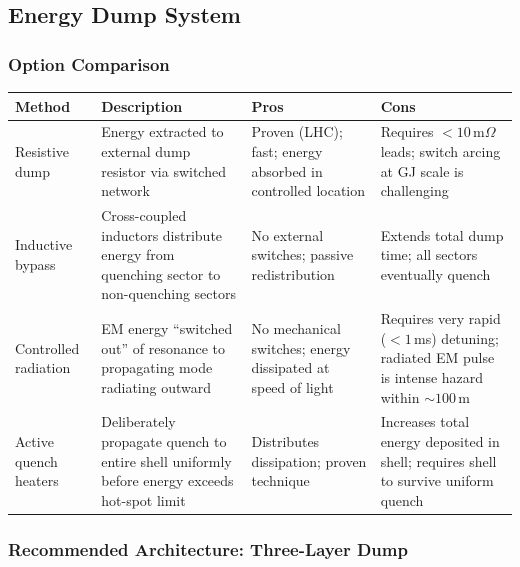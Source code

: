 \documentclass[11pt,a4paper]{article}
\begin{document}
\subsection{Energy Dump System}

\subsubsection{Option Comparison}

\begin{longtable}{p{0.18\tw}p{0.25\tw}p{0.25\tw}p{0.22\tw}}
\toprule
\textbf{Method} & \textbf{Description} & \textbf{Pros} & \textbf{Cons} \\
\midrule
\endhead
Resistive dump & Energy extracted to external dump resistor via
  switched network &
  Proven (LHC); fast; energy absorbed in controlled location &
  Requires $< 10$\,m$\Omega$ leads; switch arcing at GJ scale is
  challenging \\[4pt]
Inductive bypass & Cross-coupled inductors distribute energy from
  quenching sector to non-quenching sectors &
  No external switches; passive redistribution &
  Extends total dump time; all sectors eventually quench \\[4pt]
Controlled radiation & EM energy ``switched out'' of resonance to
  propagating mode radiating outward &
  No mechanical switches; energy dissipated at speed of light &
  Requires very rapid ($<1$\,ms) detuning; radiated EM pulse is
  intense hazard within $\sim 100$\,m \\[4pt]
Active quench heaters & Deliberately propagate quench to entire
  shell uniformly before energy exceeds hot-spot limit &
  Distributes dissipation; proven technique &
  Increases total energy deposited in shell; requires shell to
  survive uniform quench \\
\bottomrule
\end{longtable}

\subsubsection{Recommended Architecture: Three-Layer Dump}
\end{document}

